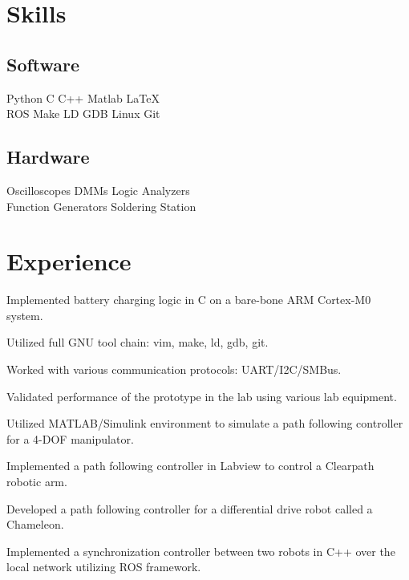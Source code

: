 \documentclass[]{deedy-resume-openfont}
\begin{document}
\section{Skills}
\begin{minipage}[t]{.6\textwidth}
\subsection{Software}
Python \textbullet{} C \textbullet{} C++ \textbullet{} Matlab \textbullet{}
\LaTeX\ \\ 
ROS \textbullet{} Make \textbullet{} LD \textbullet{} GDB \textbullet{} Linux \textbullet{} Git
\sectionsep
\end{minipage}
\hfill
\begin{minipage}[t]{.35\textwidth}
\subsection{Hardware}
Oscilloscopes \textbullet{} DMMs \textbullet{} Logic Analyzers\\
Function Generators \textbullet{} Soldering Station\\ 
\end{minipage}

\section{Experience}

\begin{tightemize}
\item Implemented battery charging logic in C on a bare-bone ARM Cortex-M0 system.
\item Utilized full GNU tool chain: vim, make, ld, gdb, git.
\item Worked with various communication protocols: UART/I2C/SMBus.
\item Validated performance of the prototype in the lab using various lab equipment.
\end{tightemize}
\sectionsep

\begin{tightemize}
\item Utilized MATLAB/Simulink environment to simulate a path following controller for a 4-DOF manipulator.
\item Implemented a path following controller in Labview to control a Clearpath robotic arm.
\item Developed a path following controller for a differential drive robot called a Chameleon.
\item Implemented a synchronization controller between two robots in C++ over the local network utilizing ROS framework.
\end{tightemize}
\sectionsep
\end{document}
